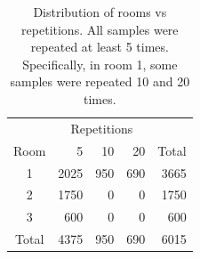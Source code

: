 \begin{table}[b]
	\centering
	\begin{tabular}{@{}crrrr@{}}
		\toprule
		& \multicolumn{3}{c}{Repetitions} & \multicolumn{1}{l}{} \\ 
		Room  & 5         & 10       & 20       & Total                \\ \midrule
		1     & 2025      & 950      & 690      & 3665                 \\
		2     & 1750      & 0        & 0        & 1750                 \\
		3     & 600       & 0        & 0        & 600                  \\ \midrule
		Total & 4375      & 950      & 690      & 6015                 \\ \bottomrule
	\end{tabular}
	\caption{Distribution of rooms vs repetitions. All samples were repeated at least 5 times. Specifically, in room 1, some samples were repeated 10 and 20 times.}
\end{table}

